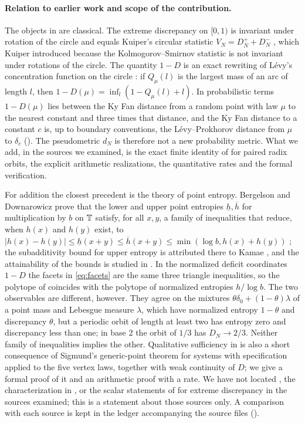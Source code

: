 \documentclass[11pt]{article}
\begin{document}
\paragraph{Relation to earlier work and scope of the contribution.}
The objects in  are classical. The extreme discrepancy on $[0,1)$ is invariant
under rotation of the circle and equals Kuiper's circular statistic $V_N=D_N^++D_N^-$
\cite{Kuiper60}, which Kuiper introduced because the Kolmogorov--Smirnov statistic is not invariant
under rotations of the circle. The quantity $1-D$ is an exact rewriting of L\'evy's
concentration function on the circle \cite{Levy39}: if $Q_\mu(l)$ is the largest mass of an arc of
length $l$, then $1-D(\mu)=\inf_l(1-Q_\mu(l)+l)$. In probabilistic terms $1-D(\mu)$ lies between the
Ky Fan distance \cite{Fan43} from a random point with law $\mu$ to the nearest constant and three
times that distance, and the Ky Fan distance to a constant $c$ is, up to boundary conventions, the
Lévy--Prokhorov distance from $\mu$ to $\delta_c$ \cite{Prokhorov56,Dudley02}
(). The pseudometric $d_N$ is therefore not a
new probability metric. What we add, in the sources we examined, is the exact finite identity of
 for paired radix orbits, the explicit arithmetic realizations, the quantitative rates
and the formal verification.

For addition the closest precedent is the theory of point entropy. Bergelson and Downarowicz prove
that the lower and upper point entropies $\underline h,\overline h$ for multiplication by $b$ on
$\mathbb T$ satisfy, for all $x,y$, a family of inequalities that reduce, when $h(x)$ and $h(y)$ exist, to
$|h(x)-h(y)|\le\underline h(x+y)\le\overline h(x+y)\le\min(\log b,h(x)+h(y))$
\cite[Proposition~4.9 and Corollary~4.10(1)]{BD25}; the subadditivity bound for upper entropy is
attributed there to Kamae \cite{Kamae76}, and the attainability of the bounds is studied in
\cite[Section~4.3]{BD25}. In the
normalized deficit coordinates $1-D$ the facets in \eqref{eq:facets} are the same three triangle
inequalities, so the polytope of  coincides with the polytope of normalized entropies
$h/\log b$. The two observables are different, however. They agree on the mixtures
$\theta\delta_0+(1-\theta)\lambda$ of a point mass and Lebesgue measure $\lambda$, which have
normalized entropy $1-\theta$ and discrepancy $\theta$, but a periodic orbit of length at least two
has entropy zero and discrepancy less than one; in base $2$ the orbit of $1/3$ has $D_N\to2/3$.
Neither family of inequalities implies the other. Qualitative sufficiency in  is also a
short consequence of Sigmund's generic-point theorem for systems with specification
\cite{Sigmund74} applied to the five vertex laws, together with weak continuity of $D$; we give a
formal proof of it and an arithmetic proof with a rate. We have not located , the
characterization in , or the scalar statements of  for extreme
discrepancy in the sources examined; this is a statement about those sources only. A comparison
with each source is kept in the ledger accompanying the source files ().
\end{document}
